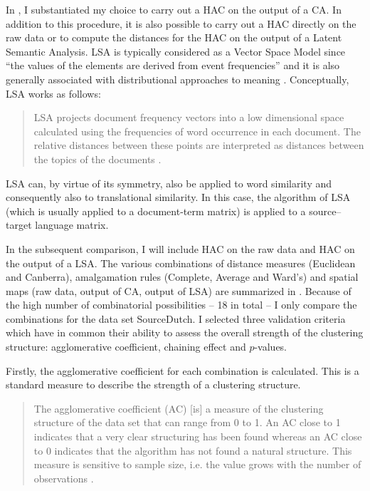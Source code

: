 In , I substantiated my choice to carry out a HAC on the output of a CA. In addition to this procedure, it is also possible to carry out a HAC directly on the raw data or to compute the distances for the HAC on the output of a Latent Semantic Analysis. LSA is typically considered as a Vector Space Model since “the values of the elements are derived from event frequencies” \citep[144]{turney_frequency_2010} and it is also generally associated with distributional approaches to meaning \citep[141]{turney_frequency_2010}. Conceptually, LSA works as follows:

\begin{quote}
LSA projects document frequency vectors into a low dimensional space calculated using the frequencies of word occurrence in each document. The relative distances between these points are interpreted as distances between the topics of the documents \citep[123]{mehler_models_2007}.
\end{quote}

LSA can, by virtue of its symmetry, also be applied to word similarity \citep[123]{mehler_models_2007} and consequently also to translational similarity. In this case, the algorithm of LSA (which is usually applied to a document-term matrix) is applied to a source–target language matrix.

In the subsequent comparison, I will include HAC on the raw data and HAC on the output of a LSA. The various combinations of distance measures (Euclidean and Canberra), amalgamation rules (Complete, Average and Ward’s) and spatial maps (raw data, output of CA, output of LSA) are summarized in . Because of the high number of combinatorial possibilities – 18 in total – I only compare the combinations for the data set SourceDutch. I selected three validation criteria which have in common their ability to assess the overall strength of the clustering structure: agglomerative coefficient, chaining effect and $p$-values.

Firstly, the agglomerative coefficient for each combination is calculated. This is a standard measure to describe the strength of a clustering structure.

\begin{quote}
The agglomerative coefficient (AC) [is] a measure of the clustering structure of the data set that can range from 0 to 1. An AC close to 1 indicates that a very clear structuring has been found whereas an AC close to 0 indicates that the algorithm has not found a natural structure. This measure is sensitive to sample size, i.e. the value grows with the number of observations \citep[426]{glynn_cluster_2014}.
\end{quote}

